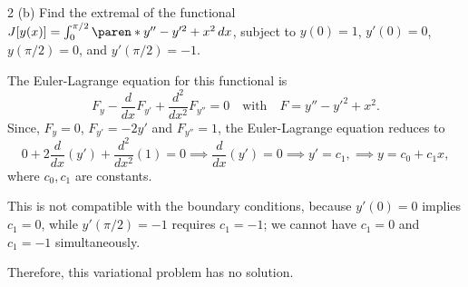 \documentclass[11pt]{penrose}
\begin{document}
\begin{problem}{2 (b)}
    Find the extremal of the functional $J[y(x)] = \int_0^{\pi/2} \paren*{y'' - y'^2 + x^2} \,dx$, subject to $y(0) = 1$, $y'(0) = 0$, $y(\pi/2) = 0$, and $y'(\pi/2) = -1$.

    \solution
    The Euler-Lagrange equation for this functional is
    \begin{equation*}
        F_{y} - \frac{d}{dx}F_{y'} + \frac{d^2}{dx^2}F_{y''} = 0 \quad\text{with}\quad F = y'' - y'^2 + x^2.
    \end{equation*}
    Since, $F_{y} = 0$, $F_{y'} = -2y'$ and $F_{y''} = 1$, the Euler-Lagrange equation reduces to
    \begin{equation*}
        0 + 2\frac{d}{dx}(y') + \frac{d^2}{dx^2}(1) = 0
        \implies
        \frac{d}{dx}(y') = 0
        \implies
        y' = c_1,
        \implies
        y = c_0 + c_1 x,
    \end{equation*}
    where $c_0, c_1$ are constants.

    This is not compatible with the boundary conditions, because $y'(0)=0$ implies $c_1 = 0$, while $y'(\pi/2) = -1$ requires $c_1 = -1$; we cannot have $c_1 = 0$ and $c_1 = -1$ simultaneously.

    Therefore, this variational problem has no solution.
\end{problem}
\end{document}
